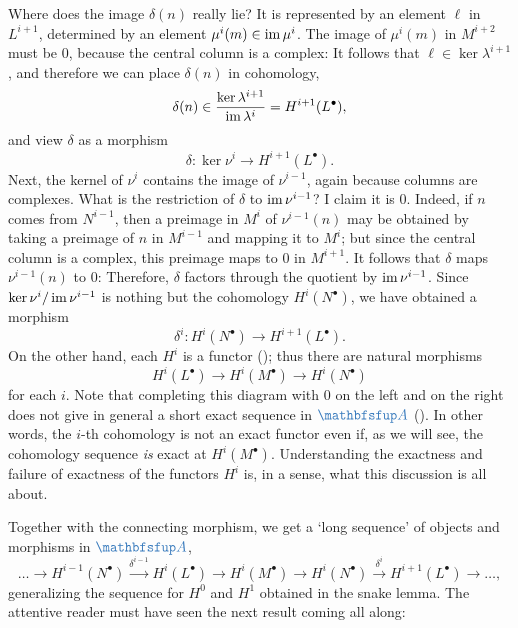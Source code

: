 Where does the image $\delta(n)$ really lie? It is represented by an
element $\ell$ in $L^{i+1}$, determined by an element
$\mu^i(m) \in \operatorname{im}\mu^i$. The image of $\mu^i(m)$ in $M^{i+2}$ must
be $0$, because the central column is a complex:
It follows that $\ell \in \ker\lambda^{i+1}$, and therefore we can
place $\delta(n)$ in cohomology,
\[
  \delta(n) \in \frac{\ker\lambda^{i+1}}{\operatorname{im}\lambda^i} =
  H^{i+1}(L^\bullet),
\]
and view $\delta$ as a morphism
\[
  \delta : \ker\nu^i \to H^{i+1}(L^\bullet).
\]
Next, the kernel of $\nu^i$ contains the image of $\nu^{i-1}$, again
because columns are complexes. What is the restriction of $\delta$ to
$\operatorname{im}\nu^{i-1}$? I claim it is $0$. Indeed, if $n$ comes from
$N^{i-1}$, then a preimage in $M^i$ of $\nu^{i-1}(n)$ may be obtained
by taking a preimage of $n$ in $M^{i-1}$ and mapping it to $M^i$; but
since the central column is a complex, this preimage maps to $0$ in
$M^{i+1}$. It follows that $\delta$ maps $\nu^{i-1}(n)$ to $0$:
Therefore, $\delta$ factors through the quotient by $\operatorname{im}\nu^{i-1}$.  Since
$\ker\nu^i / \operatorname{im}\nu^{i-1}$ is nothing but the cohomology
$H^i(N^\bullet)$, we have obtained a morphism
\[
  \delta^i : H^i(N^\bullet) \to H^{i+1}(L^\bullet).
\]
On the other hand, each $H^i$ is a functor (); thus
there are natural morphisms
\[
  H^i(L^\bullet) \longrightarrow H^i(M^\bullet) \longrightarrow
  H^i(N^\bullet)
\]
for each $i$. Note that completing this diagram with $0$ on the left
and on the right does not give in general a short exact sequence in
$\categ{A}$
(). In
other words, the $i$-th cohomology is not an exact functor even if, as
we will see, the cohomology sequence \emph{is} exact at
$H^i(M^\bullet)$. Understanding the exactness and failure of exactness
of the functors $H^i$ is, in a sense, what this discussion is all
about.

Together with the connecting morphism, we get a `long sequence' of
objects and morphisms in $\categ{A}$,
\[
  \dots \longrightarrow H^{i-1}(N^\bullet) \xrightarrow{\delta^{i-1}}
  H^i(L^\bullet) \longrightarrow H^i(M^\bullet) \longrightarrow
  H^i(N^\bullet) \xrightarrow{\delta^i} H^{i+1}(L^\bullet)
  \longrightarrow \dots,
\]
generalizing the sequence for $H^0$ and $H^1$ obtained in the snake
lemma. The attentive reader must have seen the next result coming all
along:

